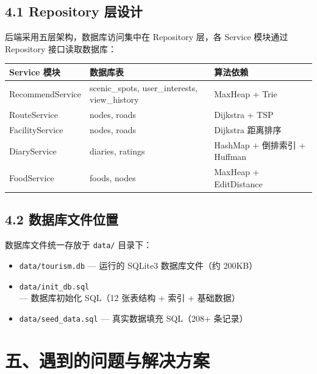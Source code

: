 \documentclass[12pt,a4paper]{article}
\begin{document}
\subsection*{4.1 Repository 层设计}

后端采用五层架构，数据库访问集中在 Repository 层，各 Service 模块通过 Repository 接口读取数据库：

\begin{center}
\begin{tabular}{l l l}
    \toprule
    \bfseries Service 模块 & \bfseries 数据库表 & \bfseries 算法依赖 \\
    \midrule
    RecommendService & scenic\_spots, user\_interests, view\_history & MaxHeap + Trie \\
    RouteService & nodes, roads & Dijkstra + TSP \\
    FacilityService & nodes, roads & Dijkstra 距离排序 \\
    DiaryService & diaries, ratings & HashMap + 倒排索引 + Huffman \\
    FoodService & foods, nodes & MaxHeap + EditDistance \\
    \bottomrule
\end{tabular}
\end{center}

\subsection*{4.2 数据库文件位置}

数据库文件统一存放于 \texttt{data/} 目录下：
\begin{itemize}[leftmargin=2em]
    \item \texttt{data/tourism.db} — 运行的 SQLite3 数据库文件（约 200KB）
    \item \texttt{data/init\_db.sql} — 数据库初始化 SQL（12 张表结构 + 索引 + 基础数据）
    \item \texttt{data/seed\_data.sql} — 真实数据填充 SQL（208+ 条记录）
\end{itemize}

\section*{五、遇到的问题与解决方案}
\end{document}
